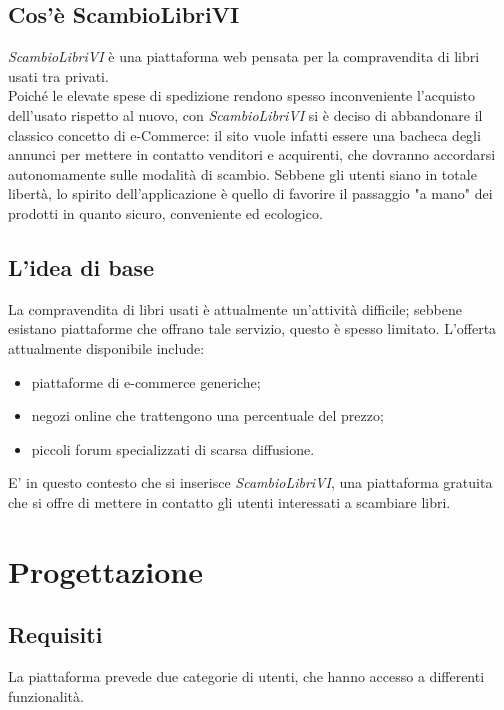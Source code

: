 \documentclass[openany,10pt,a4paper]{article}
\begin{document}
	\subsection{Cos'è ScambioLibriVI}
		\textit{ScambioLibriVI} è una piattaforma web pensata per la compravendita di libri usati tra privati. \\
		Poiché le elevate spese di spedizione rendono spesso inconveniente l'acquisto dell'usato rispetto al nuovo, con \textit{ScambioLibriVI} si è deciso di abbandonare il classico concetto di e-Commerce: il sito vuole infatti essere una bacheca degli annunci per mettere in contatto venditori e acquirenti, che dovranno accordarsi autonomamente sulle modalità di scambio. Sebbene gli utenti siano in totale libertà, lo spirito dell'applicazione è quello di favorire il passaggio "a mano" dei prodotti in quanto sicuro, conveniente ed ecologico.
	\subsection{L'idea di base}
	La compravendita di libri usati è attualmente un'attività difficile; sebbene esistano piattaforme che offrano tale servizio, questo è spesso limitato. L'offerta attualmente disponibile include:
	\begin{itemize}
		\item piattaforme di e-commerce generiche;
		\item negozi online che trattengono una percentuale del prezzo;
		\item piccoli forum specializzati di scarsa diffusione.
	\end{itemize}
	E' in questo contesto che si inserisce \textit{ScambioLibriVI}, una piattaforma gratuita che si offre di mettere in contatto gli utenti interessati a scambiare libri.
\section{Progettazione}
	\subsection{Requisiti}
		La piattaforma prevede due categorie di utenti, che hanno accesso a differenti funzionalità.
\end{document}
